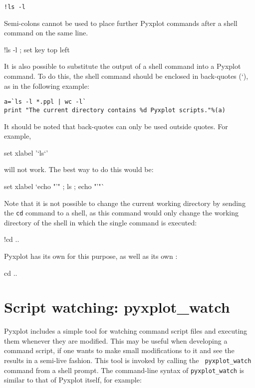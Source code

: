 \begin{verbatim}
!ls -l
\end{verbatim}

\noindent Semi-colons cannot be used to place further Pyxplot commands after a
shell command on the same line.

\begin{dontdo}
!ls -l ; set key top left
\end{dontdo}

It is also possible to substitute the output of a shell command into a Pyxplot
command. To do this, the shell command should be enclosed in back-quotes (`),
as in the following example:

\begin{verbatim}
a=`ls -l *.ppl | wc -l`
print "The current directory contains %d Pyxplot scripts."%(a)
\end{verbatim}

It should be noted that back-quotes can only be used outside quotes. For
example,

\begin{dontdo}
set xlabel '`ls`'
\end{dontdo}

\noindent will not work. The best way to do this would be:

\begin{dodo}
set xlabel `echo "'" ; ls ; echo "'"`
\end{dodo}

Note that it is not possible to change the current working directory by sending
the {\tt cd} command to a shell, as this command would only change the working
directory of the shell in which the single command is executed:

\begin{dontdo}
!cd ..
\end{dontdo}

\noindent Pyxplot has its own  for this purpose, as well as its own
:

\begin{dodo}
cd ..
\end{dodo}

\section{Script watching: pyxplot\_watch}

Pyxplot includes a simple tool for watching command script files and executing
them whenever they are modified. This may be useful when developing a command
script, if one wants to make small modifications to it and see the results in a
semi-live fashion. This tool is invoked by calling the {\tt
pyxplot\_watch} command from a
shell prompt. The command-line syntax of {\tt pyxplot\_watch} is similar to
that of Pyxplot itself, for example:

